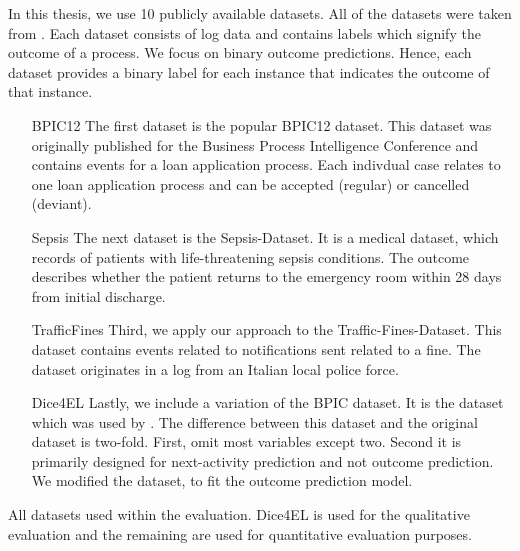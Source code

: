 \documentclass[./../../paper.tex]{subfiles}
\begin{document}
In this thesis, we use 10 publicly available datasets. All of the datasets were taken from \citeauthor{teinemaa_OutcomeOrientedPredictiveProcess_2018a}. Each dataset consists of log data and contains labels which signify the outcome of a process. We focus on binary outcome predictions. Hence, each dataset provides a binary label for each \gls{instance} that indicates the outcome of that \gls{instance}. 

\begin{enumerate}
    \item[BPIC12] The first dataset is the popular BPIC12 dataset. This dataset was originally published for the Business Process Intelligence Conference and contains events for a loan application process. Each indivdual case relates to one loan application process and can be accepted (regular) or cancelled (deviant).
    \item[Sepsis] The next dataset is the Sepsis-Dataset. It is a medical dataset, which records of patients with life-threatening sepsis conditions. The outcome describes whether the patient returns to the emergency room within 28 days from initial discharge.
    \item[TrafficFines] Third, we apply our approach to the Traffic-Fines-Dataset. This dataset contains events related to notifications sent related to a fine. The dataset originates in a log from an Italian local police force.
    \item[Dice4EL] Lastly, we include a variation of the BPIC dataset. It is the dataset which was used by \citeauthor{hsieh_DiCE4ELInterpretingProcess_2021}. The difference between this dataset and the original dataset is two-fold. First, \citeauthor{hsieh_DiCE4ELInterpretingProcess_2021} omit most variables except two. Second it is primarily designed for next-activity prediction and not outcome prediction. We modified the dataset, to fit the outcome prediction model.
\end{enumerate}

\begin{table}[htbp]
        \makebox[\linewidth]{
            
            }
            \caption{All datasets used within the evaluation. Dice4EL is used for the qualitative evaluation and the remaining are used for quantitative evaluation purposes.}
            \label{tbl:dataset-stats}
\end{table}
\end{document}
